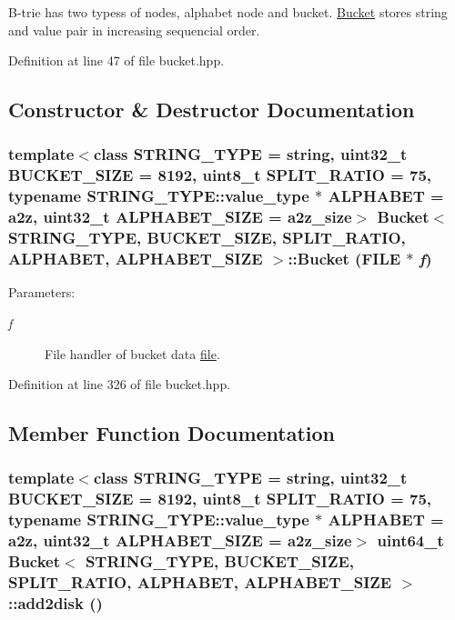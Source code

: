 B-trie has two typess of nodes, alphabet node and bucket. \hyperlink{classBucket}{Bucket} stores string and value pair in increasing sequencial order. 

Definition at line 47 of file bucket.hpp.

\subsection{Constructor \& Destructor Documentation}
\hypertarget{classBucket_a0bd7f7ab82c22a5e7d04e0b60041276}{
\subsubsection[{Bucket}]{\setlength{\rightskip}{0pt plus 5cm}template$<$class STRING\_\-TYPE  = string, uint32\_\-t BUCKET\_\-SIZE = 8192, uint8\_\-t SPLIT\_\-RATIO = 75, typename STRING\_\-TYPE::value\_\-type $\ast$ ALPHABET = a2z, uint32\_\-t ALPHABET\_\-SIZE = a2z\_\-size$>$ {\bf Bucket}$<$ STRING\_\-TYPE, BUCKET\_\-SIZE, SPLIT\_\-RATIO, ALPHABET, ALPHABET\_\-SIZE $>$::{\bf Bucket} (FILE $\ast$ {\em f})}}
\label{classBucket_a0bd7f7ab82c22a5e7d04e0b60041276}


\begin{Desc}
\item[Parameters:]
\begin{description}
\item[{\em f}]File handler of bucket data \hyperlink{classfile}{file}. \end{description}
\end{Desc}


Definition at line 326 of file bucket.hpp.

\subsection{Member Function Documentation}
\hypertarget{classBucket_33dd269a8695c6b43c7b6f529fb00ba1}{
\subsubsection[{add2disk}]{\setlength{\rightskip}{0pt plus 5cm}template$<$class STRING\_\-TYPE  = string, uint32\_\-t BUCKET\_\-SIZE = 8192, uint8\_\-t SPLIT\_\-RATIO = 75, typename STRING\_\-TYPE::value\_\-type $\ast$ ALPHABET = a2z, uint32\_\-t ALPHABET\_\-SIZE = a2z\_\-size$>$ uint64\_\-t {\bf Bucket}$<$ STRING\_\-TYPE, BUCKET\_\-SIZE, SPLIT\_\-RATIO, ALPHABET, ALPHABET\_\-SIZE $>$::add2disk ()}}
\label{classBucket_33dd269a8695c6b43c7b6f529fb00ba1}


